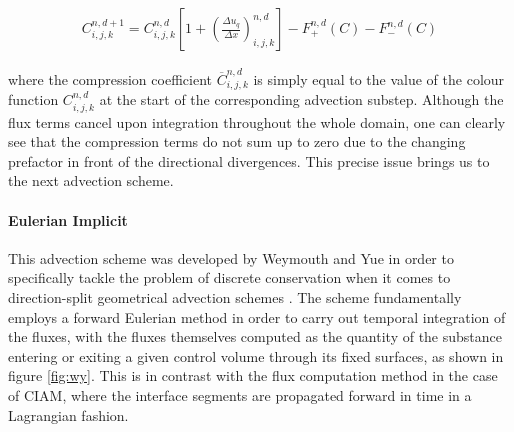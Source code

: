 \begin{align}
C_{i,j,k}^{n,d+1} =  C_{i,j,k}^{n,d}\left[1 + \left(\frac{\Delta u_q}{\Delta x}\right)^{n,d}_{i,j,k} \right] - F_{+}^{n,d}\left(C \right) - F_{-}^{n,d}\left(C \right)   
\label{ciam_discrete}
\end{align}

where the compression coefficient $\overline{C}_{i,j,k}^{n,d}$ is simply equal 
to the value of the colour function $C_{i,j,k}^{n,d}$ at the start of the 
corresponding advection substep. Although the flux terms cancel upon integration 
throughout the whole domain, one can clearly see that the compression terms do 
not sum up to zero due to the changing prefactor in front of the directional divergences. 
This precise issue brings us to the next advection scheme.      

\paragraph{Eulerian Implicit}
This advection scheme was developed by Weymouth and Yue \cite{wy} in order to 
specifically tackle the problem of discrete conservation when it comes to direction-split 
geometrical advection schemes . 
The scheme fundamentally employs a forward Eulerian method in order to carry out temporal 
integration of the fluxes, with the fluxes themselves computed as the quantity of the substance 
entering or exiting a given control volume through its fixed surfaces, as shown in figure \ref{fig:wy}. 
This is in contrast with the flux computation method in the case of CIAM, 
where the interface segments are propagated forward in time in a Lagrangian fashion. 

